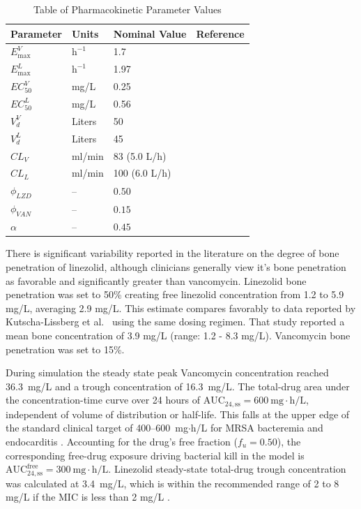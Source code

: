 \documentclass[journal]{IEEEtran}
\begin{document}
\begin{table}[!t]
\centering
\renewcommand{\arraystretch}{1.35}
\caption{Table of Pharmacokinetic Parameter Values}\label{tab:PKparams}
\begin{tabular}{l l l l}
\hline
\textbf{Parameter} & \textbf{Units} & \textbf{Nominal Value} & \textbf{Reference} \\
\hline
$E_{\max}^{V}$ & $\mathrm{h^{-1}}$ & 1.7 & \cite{VeraYunca2025}\\
$E_{\max}^{L}$ & $\mathrm{h^{-1}}$ & 1.97 & \cite{VeraYunca2025}\\
$EC_{50}^{V}$ & mg/L & 0.25 & \cite{VeraYunca2025}\\
$EC_{50}^{L}$ & mg/L & 0.56 & \cite{VeraYunca2025}\\
$V_d^{V}$ & Liters & 50 & \cite{Matzke1986} \\
$V_d^{L}$ & Liters & 45  &  \cite{dryden2011linezolid} \\
$CL_{V}$ & ml/min & 83 (5.0 L/h) & \cite{Matzke1986} \\
$CL_{L}$ & ml/min & 100 (6.0 L/h) & \cite{dryden2011linezolid} \\
$\phi_{LZD}$           & --                  & $0.50$              & \cite{dryden2011linezolid,kutschalissberg2003linezolid} \\
$\phi_{VAN}$           & --                  & $0.15$              & \cite{MomoduSavaliya2023,spellberg2012systemic} \\
$\alpha$               & --                  & $0.45$              & \cite{VeraYunca2025} \\
\hline
\end{tabular}
\end{table}

There is significant variability reported in the literature on the degree of bone penetration of linezolid,
although clinicians generally view it's bone penetration as favorable and significantly greater than vancomycin.
Linezolid bone penetration was set to 50\% creating free linezolid concentration from 1.2 to 5.9 mg/L, averaging 2.9 mg/L.
This estimate compares favorably
to data reported by Kutscha-Lissberg et al.~\cite{kutschalissberg2003linezolid} using the same dosing regimen.  That study reported a mean bone
concentration of 3.9 mg/L (range: 1.2 - 8.3 mg/L).
Vancomycin bone penetration was set to 15\%.

During simulation the steady state peak Vancomycin concentration reached 36.3~mg/L and a trough concentration of 16.3~mg/L.  The total-drug
area under the concentration-time curve over 24 hours of
$\mathrm{AUC}_{24,\mathrm{ss}} = 600~\mathrm{mg\cdot h/L}$,
independent of volume of distribution or half-life. This falls at the upper
edge of the standard clinical target of 400--600~mg$\cdot$h/L for MRSA
bacteremia and endocarditis \cite{rybak2020therapeutic}. Accounting for the drug's free fraction
($f_u = 0.50$), the corresponding free-drug exposure driving bacterial kill
in the model is $\mathrm{AUC}_{24,\mathrm{ss}}^{\text{free}} = 300~\mathrm{mg\cdot h/L}$.
Linezolid steady-state total-drug trough concentration was calculated at 3.4~mg/L,
which is within the recommended range of 2 to 8 mg/L if the MIC is less than 2 mg/L \cite{alsultan2019determining}.
\end{document}

